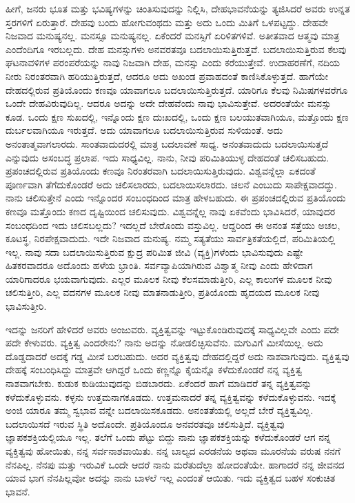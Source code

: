 \vskip 2pt

ಹೀಗೆ, ಜನರು ಭೂತ ಮತ್ತು ಭವಿಷ್ಯಗಳನ್ನು ಚಿಂತಿಸುವುದನ್ನು ನಿಲ್ಲಿಸಿ, ದೇಹಭಾವನೆಯನ್ನು ತ್ಯಜಿಸಿದರೆ ಅವರು ಉನ್ನತ ಸ್ತರಗಳಿಗೆ ಏರುತ್ತಾರೆ. ದೇಹವು ಬಂದು ಹೋಗುವಂಥದು ಮತ್ತು ಅದು ಒಂದು ಮಿತಿಗೆ ಒಳಪಟ್ಟದ್ದು. ದೇಹವೇ ನಿಜವಾದ ಮನುಷ್ಯನಲ್ಲ. ಮನಸ್ಸೂ ಮನುಷ್ಯನಲ್ಲ. ಏಕೆಂದರೆ ಮನಸ್ಸಿಗೆ ಏರಿಳಿತಗಳಿವೆ. ಅತೀತವಾದ ಆತ್ಮವು ಮಾತ್ರ ಎಂದೆಂದಿಗೂ ಇರಬಲ್ಲದು. ದೇಹ ಮನಸ್ಸುಗಳು ಅನವರತವೂ ಬದಲಾಯಿಸುತ್ತಿರುತ್ತವೆ. ಬದಲಾಯಿಸುತ್ತಿರುವ ಕೆಲವು ಘಟನಾವಳಿಗಳ ಪರಂಪರೆಯನ್ನು ನಾವು ನಿಜವಾಗಿ ದೇಹ, ಮನಸ್ಸು ಎಂದು ಕರೆಯುತ್ತೇವೆ. ಉದಾಹರಣೆಗೆ, ನದಿಯ ನೀರು ನಿರಂತರವಾಗಿ ಹರಿಯುತ್ತಿರುತ್ತದೆ, ಆದರೂ ಅದು ಅಖಂಡ ಪ್ರವಾಹದಂತೆ ಕಾಣಿಸಿಕೊಳ್ಳುತ್ತದೆ. ಹಾಗೆಯೇ ದೇಹದಲ್ಲಿರುವ ಪ್ರತಿಯೊಂದು ಕಣವೂ ಯಾವಾಗಲೂ ಬದಲಾಯಿಸುತ್ತಿರುತ್ತದೆ. ಯಾರಿಗೂ ಕೆಲವು ನಿಮಿಷಗಳವರೆಗೂ ಒಂದೇ ದೇಹವಿರುವುದಿಲ್ಲ. ಆದರೂ ಅದನ್ನು ಅದೇ ದೇಹವೆಂದು ನಾವು ಭಾವಿಸುತ್ತೇವೆ. ಅದರಂತೆಯೇ ಮನಸ್ಸು ಕೂಡ. ಒಂದು ಕ್ಷಣ ಸುಖದಲ್ಲಿ, ಇನ್ನೊಂದು ಕ್ಷಣ ದುಃಖದಲ್ಲಿ, ಒಂದು ಕ್ಷಣ ಬಲಯುತವಾಗಿಯೂ, ಮತ್ತೊಂದು ಕ್ಷಣ ದುರ್ಬಲವಾಗಿಯೂ ಇರುತ್ತದೆ. ಅದು ಯಾವಾಗಲೂ ಬದಲಾಯಿಸುತ್ತಿರುವ ಸುಳಿಯಂತೆ. ಅದು ಅನಂತಾತ್ಮವಾಗಲಾರದು. ಸಾಂತವಾದುದರಲ್ಲಿ ಮಾತ್ರ ಬದಲಾವಣೆ ಸಾಧ್ಯ. ಅನಂತವಾದುದು ಬದಲಾಯಿಸುತ್ತದೆ ಎನ್ನುವುದು ಅಸಂಬದ್ಧ ಪ್ರಲಾಪ. ಇದು ಸಾಧ್ಯವಿಲ್ಲ. ನಾನು, ನೀವು ಪರಿಮಿತಿಯುಳ್ಳ ದೇಹದಂತೆ ಚಲಿಸಬಹುದು. ಪ್ರಪಂಚದಲ್ಲಿರುವ ಪ್ರತಿಯೊಂದು ಕಣವೂ ನಿರಂತರವಾಗಿ ಬದಲಾಯಿಸುತ್ತಿರುವುದು. ವಿಶ್ವವನ್ನೆಲ್ಲಾ ಏಕದಂತೆ ಪೂರ್ಣವಾಗಿ ತೆಗೆದುಕೊಂಡರೆ ಅದು ಚಲಿಸಲಾರದು, ಬದಲಾಯಿಸಲಾರದು. ಚಲನೆ ಎಂಬುದು ಸಾಪೇಕ್ಷವಾದದ್ದು. ನಾನು ಚಲಿಸುತ್ತೇನೆ ಎಂದು ಇನ್ನೊಂದರ ಸಂಬಂಧದಿಂದ ಮಾತ್ರ ಹೇಳಬಹುದು. ಈ ಪ್ರಪಂಚದಲ್ಲಿರುವ ಪ್ರತಿಯೊಂದು ಕಣವೂ ಮತ್ತೊಂದು ಕಣದ ದೃಷ್ಟಿಯಿಂದ ಚಲಿಸುವುದು. ವಿಶ್ವವನ್ನೆಲ್ಲ ನಾವು ಏಕವೆಂದು ಭಾವಿಸಿದರೆ, ಯಾವುದರ ಸಂಬಂಧದಿಂದ ಇದು ಚಲಿಸಬಲ್ಲದು? ಇದಲ್ಲದೆ ಬೇರೊಂದು ವಸ್ತುವಿಲ್ಲ. ಆದ್ದರಿಂದ ಈ ಅನಂತ ಸತ್ತೆಯು ಅಚಲ, ಕೂಟಸ್ಥ, ನಿರಪೇಕ್ಷವಾದುದು. ಇದೇ ನಿಜವಾದ ಮನುಷ್ಯ. ನಮ್ಮ ಸತ್ಯತೆಯು ಸಾರ್ವತ್ರಿಕತೆಯಲ್ಲಿದೆ, ಪರಿಮಿತಿಯಲ್ಲಿ ಇಲ್ಲ. ನಾವು ಸದಾ ಬದಲಾಯಿಸುತ್ತಿರುವ ಕ್ಷುದ್ರ ಪರಿಮಿತ ಜೀವಿ (ವ್ಯಕ್ತಿ)ಗಳೆಂದು ಭಾವಿಸುವುದು ಎಷ್ಟೇ ಹಿತಕರವಾದರೂ ಅದೊಂದು ಹಳೆಯ ಭ್ರಾಂತಿ. ಸರ್ವವ್ಯಾಪಿಯಾಗಿರುವ ವಿಶ್ವಾತ್ಮ ನೀವು ಎಂದು ಹೇಳಿದಾಗ ಯಾರಿಗಾದರೂ ಭಯವಾಗುವುದು. ಎಲ್ಲರ ಮೂಲಕ ನೀವು ಕೆಲಸಮಾಡುತ್ತೀರಿ, ಎಲ್ಲ ಕಾಲುಗಳ ಮೂಲಕ ನೀವು ಚಲಿಸುತ್ತೀರಿ, ಎಲ್ಲ ವದನಗಳ ಮೂಲಕ ನೀವು ಮಾತನಾಡುತ್ತೀರಿ, ಪ್ರತಿಯೊಂದು ಹೃದಯದ ಮೂಲಕ ನೀವು ಭಾವಿಸುತ್ತೀರಿ.

\vskip 2pt

ಇದನ್ನು ಜನರಿಗೆ ಹೇಳಿದರೆ ಅವರು ಅಂಜುವರು. ವ್ಯಕ್ತಿತ್ವವನ್ನು ಇಟ್ಟುಕೊಂಡಿರುವುದಕ್ಕೆ ಸಾಧ್ಯವಿಲ್ಲವೇ ಎಂದು ಪದೇ ಪದೇ ಕೇಳುವರು. ವ್ಯಕ್ತಿತ್ವ ಎಂದರೇನು? ನಾನು ಅದನ್ನು ನೋಡಲಿಚ್ಛಿಸುವೆನು. ಮಗುವಿಗೆ ಮೀಸೆಯಿಲ್ಲ. ಅದು ದೊಡ್ಡದಾದರೆ ಅದಕ್ಕೆ ಗಡ್ಡ ಮೀಸೆ ಬರಬಹುದು. ಅದರ ವ್ಯಕ್ತಿತ್ವವು ದೇಹದಲ್ಲಿದ್ದರೆ ಅದು ನಾಶವಾಗುವುದು. ವ್ಯಕ್ತಿತ್ವವು ದೇಹಕ್ಕೆ ಸಂಬಂಧಿಸಿದ್ದು ಮಾತ್ರವೇ ಆಗಿದ್ದರೆ ಒಂದು ಕಣ್ಣನ್ನೊ ಕೈಯನ್ನೊ ಕಳೆದುಕೊಂಡರೆ ನನ್ನ ವ್ಯಕ್ತಿತ್ವ ನಾಶವಾಗಬೇಕು. ಕುಡುಕ ಕುಡಿಯುವುದನ್ನು ಬಿಡಬಾರದು. ಏಕೆಂದರೆ ಹಾಗೆ ಮಾಡಿದರೆ ತನ್ನ ವ್ಯಕ್ತಿತ್ವವನ್ನು ಕಳೆದುಕೊಳ್ಳುವನು. ಕಳ್ಳನು ಉತ್ತಮನಾಗಕೂಡದು. ಉತ್ತಮನಾದರೆ ತನ್ನ ವ್ಯಕ್ತಿತ್ವವನ್ನು ಕಳೆದುಕೊಳ್ಳುವನು. ಇದಕ್ಕೆ ಅಂಜಿ ಯಾರೂ ತಮ್ಮ ಸ್ವಭಾವ ವನ್ನೇ ಬದಲಾಯಿಸಕೂಡದು. ಅನಂತತೆಯಲ್ಲಿ ಅಲ್ಲದೆ ಬೇರೆ ವ್ಯಕ್ತಿತ್ವವಿಲ್ಲ. ಬದಲಾಯಿಸದೆ ಇರುವ ಸ್ಥಿತಿ ಅದೊಂದೇ. ಪ್ರತಿಯೊಂದೂ ಅನವರತವೂ ಚಲಿಸುತ್ತಿದೆ. ವ್ಯಕ್ತಿತ್ವವು ಜ್ಞಾಪಕಶಕ್ತಿಯಲ್ಲಿಯೂ ಇಲ್ಲ. ತಲೆಗೆ ಒಂದು ಪೆಟ್ಟು ಬಿದ್ದು ನಾನು ಜ್ಞಾಪಕಶಕ್ತಿಯನ್ನು ಕಳೆದುಕೊಂಡರೆ ಆಗ ನನ್ನ ವ್ಯಕ್ತಿತ್ವವು ಹೋಯಿತು, ನನ್ನ ಸರ್ವನಾಶವಾಯಿತು. ನನ್ನ ಬಾಲ್ಯದ ಎರಡನೆಯ ಅಥವಾ ಮೂರನೆಯ ವರುಷ ನನಗೆ ನೆನಪಿಲ್ಲ. ನೆನಪು ಮತ್ತು ಇರುವಿಕೆ ಒಂದೇ ಆದರೆ ನಾನು ಮರೆತುದೆಲ್ಲಾ ಹೋದಂತೆಯೇ. ಹಾಗಾದರೆ ನನ್ನ ಜೀವನದ ಯಾವ ಭಾಗ ನೆನಪಿಲ್ಲವೋ ಅದನ್ನು ನಾನು ಬಾಳಲೆ ಇಲ್ಲ ಎಂದಂತೆ ಆಯಿತು. ಇದು ವ್ಯಕ್ತಿತ್ವದ ಬಹಳ ಸಂಕುಚಿತ ಭಾವನೆ.

